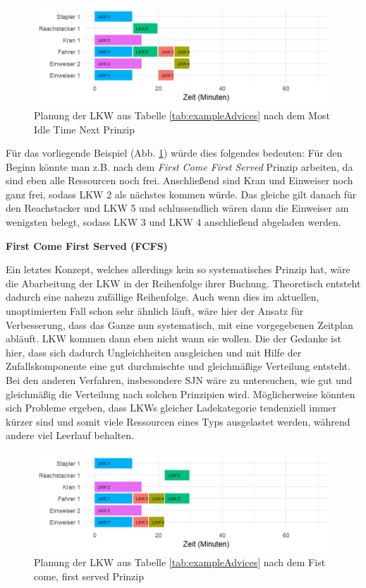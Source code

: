 \begin{figure}[H]
    \centering
    \includegraphics[width=\textwidth]{images/timelines/rsMostIdleExample.png}
    \caption{Planung der LKW aus Tabelle \ref{tab:exampleAdvices} nach dem Most Idle Time Next Prinzip}
    \label{fig:rsMitnExample}
\end{figure}

Für das vorliegende Beispiel  (Abb. \ref{fig:rsMitnExample}) würde dies folgendes bedeuten: Für den Beginn könnte man z.B. nach dem \textit{First Come First Served} Prinzip arbeiten, da sind eben alle Ressourcen noch frei. Anschließend sind Kran und Einweiser noch ganz frei, sodass LKW 2 als nächstes kommen würde. Das gleiche gilt danach für den Reachstacker und LKW 5 und schlussendlich wären dann die Einweiser am wenigsten belegt, sodass LKW 3 und LKW 4 anschließend abgeladen werden.

\textbf{First Come First Served (FCFS)}

Ein letztes Konzept, welches allerdings kein so systematisches Prinzip hat, wäre die Abarbeitung der LKW in der Reihenfolge ihrer Buchung. Theoretisch entsteht dadurch eine nahezu zufällige Reihenfolge. Auch wenn dies im aktuellen, unoptimierten Fall schon sehr ähnlich läuft, wäre hier der Ansatz für Verbesserung, dass das Ganze nun systematisch, mit eine vorgegebenen Zeitplan abläuft. LKW kommen dann eben nicht wann sie wollen. Die der Gedanke ist hier, dass sich dadurch Ungleichheiten ausgleichen und mit Hilfe der Zufallskomponente eine gut durchmischte und gleichmäßige Verteilung entsteht. Bei den anderen Verfahren, insbesondere SJN wäre zu untersuchen, wie gut und gleichmäßig die Verteilung nach solchen Prinzipien wird. Möglicherweise könnten sich Probleme ergeben, dass LKWs gleicher Ladekategorie tendenziell immer kürzer sind und somit viele Ressourcen eines Typs ausgelastet werden, während andere viel Leerlauf behalten.

\begin{figure}[H]
    \centering
    \includegraphics[width=\textwidth]{images/timelines/rsFcfsExample.png}
    \caption{Planung der LKW aus Tabelle \ref{tab:exampleAdvices} nach dem Fist come, first served Prinzip}
    \label{fig:rsFcfsExample}
\end{figure}

